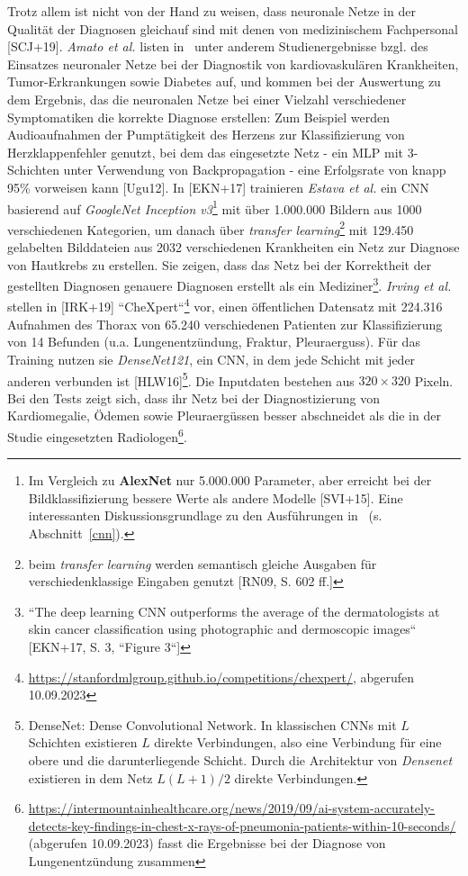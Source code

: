 Trotz allem ist nicht von der Hand zu weisen, dass neuronale Netze in der Qualität der Diagnosen gleichauf sind mit denen von medizinischem Fachpersonal [SCJ+19]. \textit{Amato et al.} listen in~\cite{ALP+13} unter anderem Studienergebnisse bzgl. des Einsatzes neuronaler Netze bei der Diagnostik von kardiovaskulären Krankheiten, Tumor-Erkrankungen sowie Diabetes auf, und kommen bei der Auswertung zu dem Ergebnis, das die neuronalen Netze bei einer Vielzahl verschiedener Symptomatiken die korrekte Diagnose erstellen: Zum Beispiel werden Audioaufnahmen der Pumptätigkeit des Herzens zur Klassifizierung von Herzklappenfehler genutzt, bei dem das eingesetzte Netz - ein MLP mit 3-Schichten unter Verwendung von Backpropagation - eine Erfolgsrate von knapp 95\% vorweisen kann [Ugu12]. In [EKN+17] trainieren \textit{Estava et al.} ein CNN basierend auf \textit{GoogleNet Inception v3}\footnote{
    Im Vergleich zu \textbf{AlexNet} nur 5.000.000 Parameter, aber erreicht bei der Bildklassifizierung bessere Werte als andere Modelle [SVI+15]. Eine interessanten Diskussionsgrundlage zu den Ausführungen in~\cite{Cun89} (s. Abschnitt~\ref{cnn}).
} mit über 1.000.000 Bildern aus 1000 verschiedenen Kategorien, um danach über \textit{transfer learning}\footnote{
    beim \textit{transfer learning} werden semantisch gleiche Ausgaben für verschiedenklassige Eingaben genutzt [RN09, S. 602 ff.]
} mit 129.450 gelabelten Bilddateien aus 2032 verschiedenen Krankheiten ein Netz zur Diagnose von Hautkrebs zu erstellen. Sie zeigen, dass das Netz bei der Korrektheit der gestellten Diagnosen genauere Diagnosen erstellt als ein Mediziner\footnote{
    ``The deep learning CNN outperforms the average of the dermatologists at skin cancer classification using photographic and dermoscopic images`` [EKN+17, S. 3, ``Figure 3``]
}.
\textit{Irving et al.} stellen in [IRK+19] ``CheXpert``\footnote{
    \url{https://stanfordmlgroup.github.io/competitions/chexpert/}, abgerufen 10.09.2023
} vor, einen öffentlichen Datensatz mit 224.316 Aufnahmen des Thorax von 65.240 verschiedenen Patienten zur Klassifizierung von 14 Befunden (u.a. Lungenentzündung, Fraktur, Pleuraerguss). Für das Training nutzen sie \textit{DenseNet121}, ein CNN, in dem jede Schicht mit jeder anderen verbunden ist [HLW16]\footnote{
    DenseNet: Dense Convolutional Network. In klassischen CNNs mit $L$ Schichten existieren $L$ direkte Verbindungen, also eine Verbindung für eine obere und die darunterliegende Schicht. Durch die Architektur von \textit{Densenet} existieren in dem Netz $L(L +1)/2$ direkte Verbindungen.
}. Die Inputdaten bestehen aus $320 \times 320$ Pixeln. Bei den Tests zeigt sich, dass ihr Netz bei der Diagnostizierung von Kardiomegalie, Ödemen sowie Pleuraergüssen besser abschneidet als die in der Studie eingesetzten Radiologen\footnote{
    \url{https://intermountainhealthcare.org/news/2019/09/ai-system-accurately-detects-key-findings-in-chest-x-rays-of-pneumonia-patients-within-10-seconds/} (abgerufen 10.09.2023) fasst die Ergebnisse bei der Diagnose von Lungenentzündung zusammen
}.

